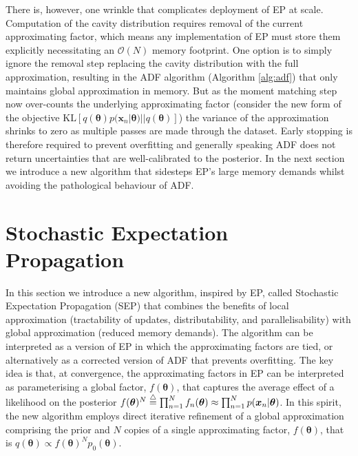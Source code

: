 There is, however, one wrinkle that complicates deployment of EP at scale. Computation of the cavity distribution requires removal of the current approximating factor, which means any implementation of EP must store them explicitly necessitating an $\mathcal{O}(N)$ memory footprint. One option is to simply ignore the removal step replacing the cavity distribution with the full approximation, resulting in the ADF algorithm (Algorithm \ref{alg:adf}) that only maintains global approximation in memory. But as the moment matching step now over-counts the underlying approximating factor (consider the new form of the objective $\mathrm{KL}[q(\bm{\theta}) p(\bm{x}_n | \bm{\theta}) || q(\bm{\theta})]$) the variance of the approximation shrinks to zero as multiple passes are made through the dataset. Early stopping is therefore required to prevent overfitting and generally speaking ADF does not return uncertainties that are well-calibrated to the posterior. 
%
In the next section we introduce a new algorithm that sidesteps EP's large memory demands whilst avoiding the pathological behaviour of ADF. 

\section{Stochastic Expectation Propagation}
%
In this section we introduce a new algorithm, inspired by EP, called Stochastic Expectation Propagation (SEP) that combines the benefits of local approximation (tractability of updates, distributability, and parallelisability) with global approximation (reduced memory demands).  The algorithm can be interpreted as a version of EP in which the approximating factors are tied, or alternatively as a corrected version of ADF that prevents overfitting. 
%
The key idea is that, at convergence, the approximating factors in EP can be interpreted as parameterising a global factor,  $f(\bm{\theta})$, that captures the average effect of a likelihood on the posterior  $f(\bm{\theta})^{N} \buildrel\triangle\over = \prod_{n=1}^{N} f_n(\bm{\theta}) \approx \prod_{n=1}^{N} p(\bm{x}_n | \bm{\theta})$. In this spirit, the new algorithm employs direct iterative refinement of a global approximation comprising the prior and $N$ copies of a single approximating factor, $f(\bm{\theta})$, that is $q(\bm{\theta}) \propto f(\bm{\theta})^N p_0(\bm{\theta})$.

